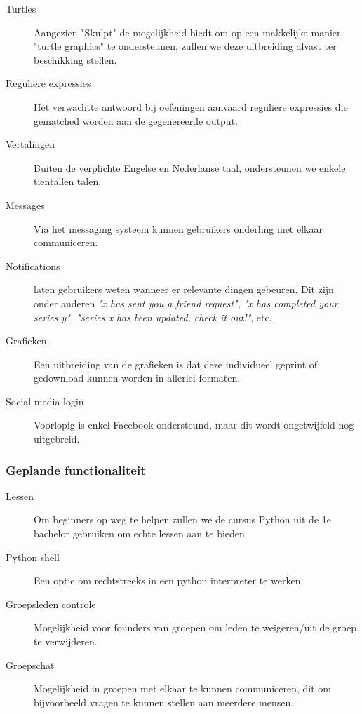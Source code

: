 \begin{description}
\item[Turtles] Aangezien "Skulpt" de mogelijkheid biedt om op een makkelijke manier "turtle graphics" te ondersteunen,
    zullen we deze uitbreiding alvast ter beschikking stellen.

\item[Reguliere expressies] Het verwachtte antwoord bij oefeningen aanvaard reguliere expressies die gematched worden
    aan de gegenereerde output.
\item[Vertalingen] Buiten de verplichte Engelse en Nederlanse taal, ondersteunen we enkele tientallen talen.
\item[Messages] Via het messaging systeem kunnen gebruikers onderling met elkaar communiceren.
\item[Notifications] laten gebruikers weten wanneer er relevante dingen gebeuren. Dit zijn onder anderen
    \textsl{"x has sent you a friend request", "x has completed your series y", "series x has been updated, check it out!"}, etc.
\item[Grafieken] Een uitbreiding van de grafieken is dat deze individueel geprint of gedownload kunnen worden in
    allerlei formaten.
\item[Social media login] Voorlopig is enkel Facebook ondersteund, maar dit wordt ongetwijfeld nog uitgebreid.
\end{description}
\subsubsection{Geplande functionaliteit}
\begin{description}
\item[Lessen] Om beginners op weg te helpen zullen we de cursus Python uit de 1e bachelor gebruiken om echte lessen
    aan te bieden.
\item[Python shell] Een optie om rechtstreeks in een python interpreter te werken.
\item[Groepsleden controle] Mogelijkheid voor founders van groepen om leden te weigeren/uit de groep te verwijderen.
\item[Groepschat] Mogelijkheid in groepen met elkaar te kunnen communiceren, dit om bijvoorbeeld vragen te kunnen
    stellen aan meerdere mensen.
\end{description}
